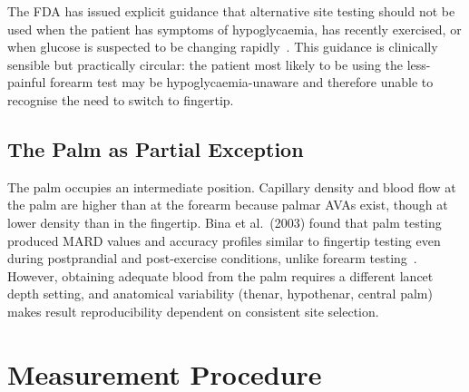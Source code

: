 The FDA has issued explicit guidance that alternative site testing should not be used when the patient has symptoms of hypoglycaemia, has recently exercised, or when glucose is suspected to be changing rapidly~\cite{fda_ast}. This guidance is clinically sensible but practically circular: the patient most likely to be using the less-painful forearm test may be hypoglycaemia-unaware and therefore unable to recognise the need to switch to fingertip.

\subsection*{The Palm as Partial Exception}

The palm occupies an intermediate position. Capillary density and blood flow at the palm are higher than at the forearm because palmar AVAs exist, though at lower density than in the fingertip. Bina et al.\ (2003) found that palm testing produced MARD values and accuracy profiles similar to fingertip testing even during postprandial and post-exercise conditions, unlike forearm testing~\cite{bina2003}. However, obtaining adequate blood from the palm requires a different lancet depth setting, and anatomical variability (thenar, hypothenar, central palm) makes result reproducibility dependent on consistent site selection.

\section{Measurement Procedure}

